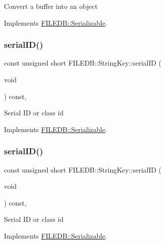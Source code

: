 Convert a buffer into an object 

Implements \mbox{\hyperlink{classFILEDB_1_1Serializable_a21a5831fa4f65790490a8a5eba9fcab2}{F\+I\+L\+E\+D\+B\+::\+Serializable}}.

\mbox{\label{classFILEDB_1_1StringKey_ad139b5cab667be479edae524f436805a}} 
\subsubsection{\texorpdfstring{serialID()}{serialID()}\hspace{0.1cm}{\footnotesize\ttfamily [1/2]}}
{\footnotesize\ttfamily const unsigned short F\+I\+L\+E\+D\+B\+::\+String\+Key\+::serial\+ID (\begin{DoxyParamCaption}\item[{void}]{ }\end{DoxyParamCaption}) const\hspace{0.3cm}{\ttfamily [inline]}, {\ttfamily [virtual]}}

Serial ID or class id 

Implements \mbox{\hyperlink{classFILEDB_1_1Serializable_a5d639b5dbd5d8ebc7dca1eca31bbc868}{F\+I\+L\+E\+D\+B\+::\+Serializable}}.

\mbox{\label{classFILEDB_1_1StringKey_ad139b5cab667be479edae524f436805a}} 
\subsubsection{\texorpdfstring{serialID()}{serialID()}\hspace{0.1cm}{\footnotesize\ttfamily [2/2]}}
{\footnotesize\ttfamily const unsigned short F\+I\+L\+E\+D\+B\+::\+String\+Key\+::serial\+ID (\begin{DoxyParamCaption}\item[{void}]{ }\end{DoxyParamCaption}) const\hspace{0.3cm}{\ttfamily [inline]}, {\ttfamily [virtual]}}

Serial ID or class id 

Implements \mbox{\hyperlink{classFILEDB_1_1Serializable_a5d639b5dbd5d8ebc7dca1eca31bbc868}{F\+I\+L\+E\+D\+B\+::\+Serializable}}.

